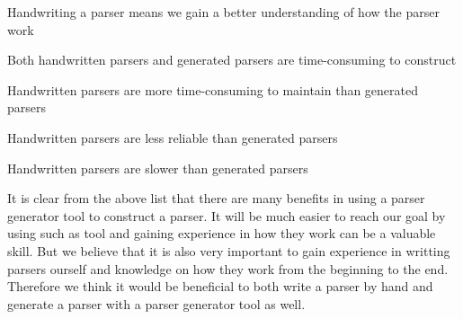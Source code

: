 \begin{dlist}
  \item Handwriting a parser means we gain a better understanding of how the parser work
  \item Both handwritten parsers and generated parsers are time-consuming to construct
  \item Handwritten parsers are more time-consuming to maintain than generated parsers
  \item Handwritten parsers are less reliable than generated parsers
  \item Handwritten parsers are slower than generated parsers
\end{dlist}

It is clear from the above list that there are many benefits in using a parser
generator tool to construct a parser. It will be much easier to reach our goal
by using such as tool and gaining experience in how they work can be a valuable
skill. But we believe that it is also very important to gain experience in
writting parsers ourself and knowledge on how they work from the beginning to
the end.  Therefore we think it would be beneficial to both write a parser by
hand and generate a parser with a parser generator tool as well.
